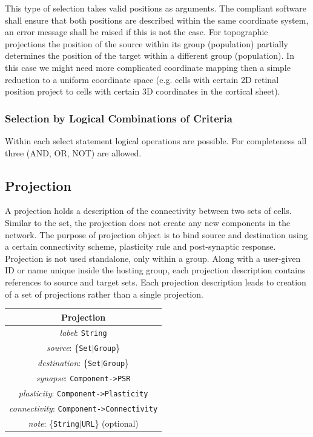 \documentclass{article}
\begin{document}
This type of selection takes valid positions as arguments. The
compliant software shall ensure that both positions are described within the
same coordinate system, an error message shall be raised if this is not the
case. For topographic projections the position of the source within its group
(population) partially determines the position of the target within a
different group (population). In this case we might need more complicated
coordinate mapping then a simple reduction to a uniform coordinate space
(e.g. cells with certain 2D retinal position project to cells with certain
3D coordinates in the cortical sheet).

\subsubsection{Selection by Logical Combinations of Criteria}

Within each select statement logical operations are possible. For completeness
all three (AND, OR, NOT) are allowed.

\subsection{Projection}
\label{projections}

A projection holds a description of the connectivity between two sets
of cells. Similar to the set, the projection does not create any new
components in the network. The purpose of projection object is to bind
source and destination using a certain connectivity scheme, plasticity
rule and post-synaptic response. Projection is not used standalone,
only within a group. Along with a user-given ID or name unique inside
the hosting group, each projection description contains references to
source and target sets. Each projection description leads to creation
of a set of projections rather than a single projection.

\begin{table}[htb]
\center
\begin{tabular}{|c|}
\hline
\hline
Projection \\
\hline
\hline
{\em label}: {\tt String} \\
\hline
{\em source}: \{{\tt Set}$|${\tt Group}\} \\
\hline
{\em destination}: \{{\tt Set}$|${\tt Group}\} \\
\hline
{\em synapse}: {\tt Component->PSR} \\
\hline
{\em plasticity}: {\tt Component->Plasticity} \\
\hline
{\em connectivity}: {\tt Component->Connectivity} \\
\hline
{\em note}: \{{\tt String}$|${\tt URL}\} (optional)\\
\hline
\end{tabular}
\end{table}
\end{document}
